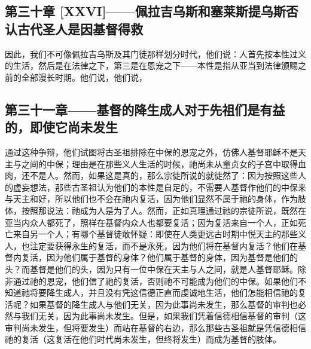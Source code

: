 
\subsection{第三十章 [XXVI]——佩拉吉乌斯和塞莱斯提乌斯否认古代圣人是因基督得救}

因此，我们不可像佩拉吉乌斯及其门徒那样划分时代，他们说：人首先按本性过义的生活，然后是在法律之下，第三是在恩宠之下——本性是指从亚当到法律颁赐之前的全部漫长时期。他们说，他们说，\par


\subsection{第三十一章——基督的降生成人对于先祖们是有益的，即使它尚未发生}

通过这种争辩，他们试图将古圣祖排除在中保的恩宠之外，仿佛人基督耶稣不是天主与之间的中保；理由是在那些义人生活的时候，祂尚未从童贞女的子宫中取得血肉，还不是人。然而，如果这是真的，那么宗徒所说的就徒然了：因为按照这些人的虚妄想法，那些古圣祖认为他们的本性是自足的，不需要人基督作他们的中保来与天主和好，所以他们也不会在祂内复活，因为他们显然不属于祂的身体，作为肢体，按照那说法：祂成为人是为了人。然而，正如真理通过祂的宗徒所说，既然在亚当内众人都死了，照样在基督内众人也都要复活；因为复活来自一个人，正如死亡来自另一个人；有哪个基督徒敢怀疑：即使在人类更远古时期中悦天主的那些义人，也注定要获得永生的复活，而不是永死，因为他们将在基督内复活？他们在基督内复活，因为他们属于基督的身体？他们属于基督的身体，因为基督是他们的头？而基督是他们的头，因为只有一位中保在天主与人之间，就是人基督耶稣。除非通过祂的恩宠，他们信了祂的复活，否则祂不可能成为他们的中保。如果他们不知道祂将要降生成人，并且没有凭这信德正直而虔诚地生活，他们怎能相信祂的复活呢？如果基督的降生成人与他们无关，因为此事尚未发生，那么基督的审判也必然与我们无关，因为此事尚未发生。但是，如果我们凭着信德相信基督的审判（这审判尚未发生，但将要发生）而站在基督的右边，那么那些古圣祖就是凭信德相信祂的复活（这复活在他们时代尚未发生，但终将发生）而成为基督的肢体。\par

